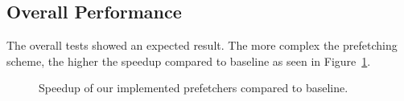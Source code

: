 \subsection{Overall Performance}
The overall tests showed an expected result. The more complex the prefetching
scheme, the higher the speedup compared to baseline as seen in
Figure~\ref{graph:base}. 
\begin{figure}[h]
    \caption{Speedup of our implemented prefetchers compared to baseline.}
    \label{graph:base}
\end{figure}

